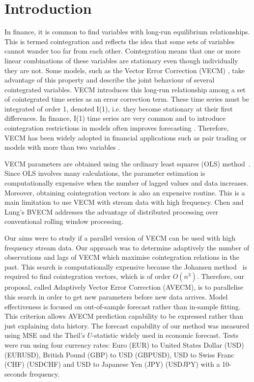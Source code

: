 \section{Introduction}
\label{sec:introduction}
In finance, it is common to find variables with long-run equilibrium
relationships. This is termed cointegration and reflects the idea that
some sets of variables cannot wander too far from each other. Cointegration
means that one or more linear combinations of these variables are stationary
even though individually they are not. Some models,
such as the Vector Error Correction (VECM) \cite{engle87}, take advantage of
this property and describe the joint behaviour of several cointegrated
variables. VECM introduces this long-run relationship among a set of cointegrated
time series as an error correction term. These time series must be integrated of order 1, denoted I(1), i.e. they become stationary at their first differences. In finance, I(1) time series are very common and 
to introduce cointegration restrictions in models often improves forecasting \cite{duy1998}. Therefore, VECM has been widely adopted in
financial applications \cite{mukherjee1995,seong2013,maysami2000,arestis2001} such as pair trading \cite{herlemont2003} or models with more than two variables \cite{mukherjee1995,engle2004}.

VECM parameters are obtained using the ordinary least squares
(OLS) method~\cite{golub1980}. Since OLS involves many calculations, the parameter estimation is computationally expensive when the number of lagged values and
data increases. Moreover, obtaining cointegration vectors 
is also an expensive routine. This is a main limitation to use VECM with stream data with high frequency.
Chen and Lung's BVECM \cite{chen2003} addresses the advantage of distributed processing over conventional rolling window processing. 

Our aims were to study if a parallel version of VECM can be used with high frequency stream data.
Our approach was to determine adaptively the number of observations and lags of VECM which
maximise cointegration relations in the past. 
 This search is computationally
expensive because the Johansen
method~\cite{johansen1995} is required to find cointegration vectors, which is of order $O(n^3)$. Therefore, our proposal, called Adaptively Vector Error Correction (AVECM), 
is to parallelise this search in order to get new parameters before new data arrives.
Model effectiveness is focused on out-of-sample forecast rather than in-sample
fitting. This criterion allows AVECM prediction capability to be
expressed rather than just explaining data history.
The forecast capability of our method was measured using MSE and the Theil's $U$-statistic \cite{theil1966} widely used in economic forecast. Tests were run using four currency rates: Euro (EUR) to
United States Dollar (USD) (EURUSD), British Pound (GBP) to USD (GBPUSD), USD to Swiss
Franc (CHF) (USDCHF) and USD to Japanese Yen (JPY) (USDJPY) with a 10-seconds frequency.

